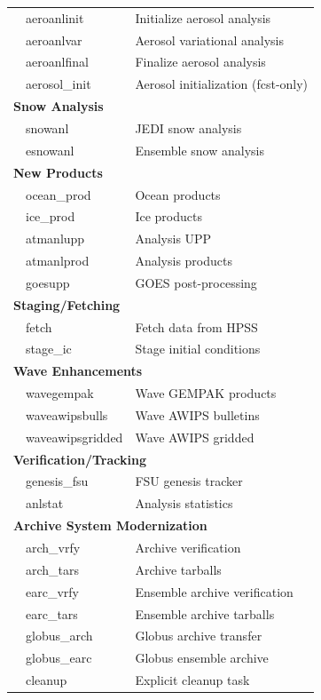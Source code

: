 \documentclass[11pt,letterpaper]{article}
\begin{document}
\begin{table}[H]
\begin{tabular}{@{}llp{8cm}@{}}
& aeroanlinit & Initialize aerosol analysis \\
& aeroanlvar & Aerosol variational analysis \\
& aeroanlfinal & Finalize aerosol analysis \\
& aerosol\_init & Aerosol initialization (fcst-only) \\
\midrule
\multicolumn{3}{l}{\textbf{Snow Analysis}} \\
& snowanl & JEDI snow analysis \\
& esnowanl & Ensemble snow analysis \\
\midrule
\multicolumn{3}{l}{\textbf{New Products}} \\
& ocean\_prod & Ocean products \\
& ice\_prod & Ice products \\
& atmanlupp & Analysis UPP \\
& atmanlprod & Analysis products \\
& goesupp & GOES post-processing \\
\midrule
\multicolumn{3}{l}{\textbf{Staging/Fetching}} \\
& fetch & Fetch data from HPSS \\
& stage\_ic & Stage initial conditions \\
\midrule
\multicolumn{3}{l}{\textbf{Wave Enhancements}} \\
& wavegempak & Wave GEMPAK products \\
& waveawipsbulls & Wave AWIPS bulletins \\
& waveawipsgridded & Wave AWIPS gridded \\
\midrule
\multicolumn{3}{l}{\textbf{Verification/Tracking}} \\
& genesis\_fsu & FSU genesis tracker \\
& anlstat & Analysis statistics \\
\midrule
\multicolumn{3}{l}{\textbf{Archive System Modernization}} \\
& arch\_vrfy & Archive verification \\
& arch\_tars & Archive tarballs \\
& earc\_vrfy & Ensemble archive verification \\
& earc\_tars & Ensemble archive tarballs \\
& globus\_arch & Globus archive transfer \\
& globus\_earc & Globus ensemble archive \\
& cleanup & Explicit cleanup task \\
\bottomrule
\end{tabular}
\end{table}
\end{document}
